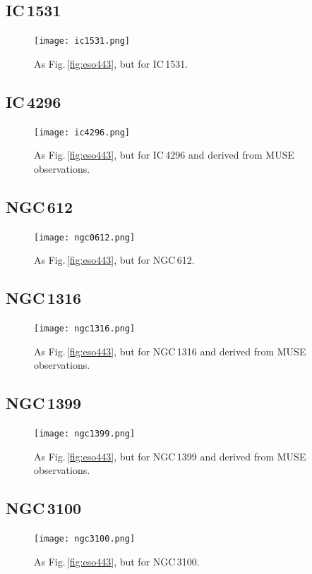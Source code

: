 \documentclass[a4paper,fleqn,usenatbib]{mnras}
\begin{document}
	\subsection{IC\,1531}
		\begin{figure}
			\centering
			\texttt{[image: ic1531.png]}
			\caption{As Fig.\,\ref{fig:eso443}, but for IC\,1531.}
			\label{fig:ic1531}
		\end{figure}

	\subsection{IC\,4296}
		\begin{figure}
			\centering
			\texttt{[image: ic4296.png]}
			\caption{As Fig.\,\ref{fig:eso443}, but for IC\,4296 and derived from MUSE observations.}
			\label{fig:ic4296}
		\end{figure}

	\subsection{NGC\,612}
		\begin{figure}
			\centering
			\texttt{[image: ngc0612.png]}
			\caption{As Fig.\,\ref{fig:eso443}, but for NGC\,612.}
			\label{fig:ngc612}
		\end{figure}

	\subsection{NGC\,1316}
		\begin{figure}
			\centering
			\texttt{[image: ngc1316.png]}
			\caption{As Fig.\,\ref{fig:eso443}, but for NGC\,1316 and derived from MUSE observations.}
			\label{fig:ngc1316}
		\end{figure}

	\subsection{NGC\,1399}
		\begin{figure}
			\centering
			\texttt{[image: ngc1399.png]}
			\caption{As Fig.\,\ref{fig:eso443}, but for NGC\,1399 and derived from MUSE observations.}
			\label{fig:ngc1399}
		\end{figure}

	\subsection{NGC\,3100}
		\begin{figure}
			\centering
			\texttt{[image: ngc3100.png]}
			\caption{As Fig.\,\ref{fig:eso443}, but for NGC\,3100.}
			\label{fig:ngc3100}
		\end{figure}
\end{document}
